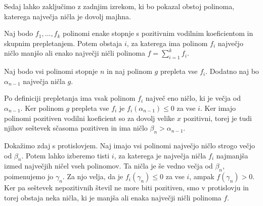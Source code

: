 Sedaj lahko zaključimo z zadnjim izrekom, ki bo pokazal obstoj polinoma, katerega največja ničla je dovolj majhna.

\begin{lema}\label{obstaja-nicla-manjsa}
    Naj bodo \(f_1, \ldots, f_k\) polinomi enake stopnje s pozitivnim vodilnim koeficientom in skupnim prepletanjem. Potem obstaja \(i\), za katerega ima polinom \(f_i\) največjo ničlo manjšo ali enako največji ničli polinoma \(f=\sum_{i=1}^k f_i\).
\end{lema}
\begin{dokaz}
    Naj bodo vsi polinomi stopnje \(n\) in naj polinom \(g\) prepleta vse \(f_i\). Dodatno naj bo \(\alpha_{n-1}\) največja ničla \(g\).
    
    Po definiciji prepletanja ima vsak polinom \(f_i\) največ eno ničlo, ki je večja od \(\alpha_{n-1}\). Ker polinom \(g\) prepleta vse \(f_i\) je \(f_i(\alpha_{n-1})\leq0\) za vse \(i\). Ker imajo polinomi pozitiven vodilni koeficient so za dovolj velike \(x\) pozitivni, torej je tudi njihov seštevek sčasoma pozitiven in ima ničlo \(\beta_n > \alpha_{n-1}\).

    Dokažimo zdaj s protislovjem. Naj imajo vsi polinomi največjo ničlo strogo večjo od \(\beta_n\). Potem lahko izberemo tisti \(i\), za katerega je največja ničla \(f_i\) najmanjša izmed največjih ničel vseh polinomov. Ta ničla je še vedno večja od \(\beta_n\), poimenujemo jo \(\gamma_n\). Za njo velja, da je \(f_i(\gamma_n) \leq 0\) za vse \(i\), ampak \(f(\gamma_n) > 0\). Ker pa seštevek nepozitivnih števil ne more biti pozitiven, smo v protislovju in torej obstaja neka ničla, ki je manjša ali enaka največji ničli polinoma \(f\).
\end{dokaz}

